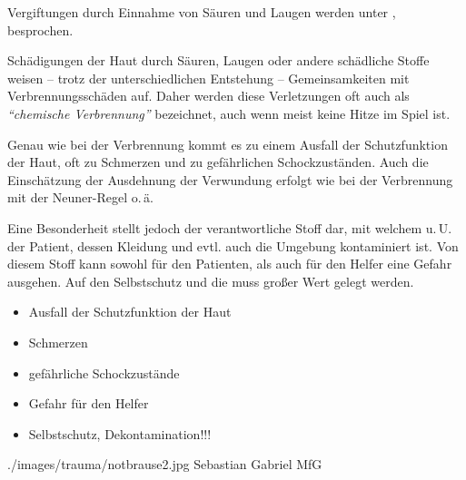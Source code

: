 Vergiftungen durch Einnahme von Säuren und Laugen werden 
unter , besprochen. 


\TextSlideTeaser
{\TxBeschreibung}%
{%
Schädigungen der Haut durch Säuren, Laugen oder andere
schädliche Stoffe weisen -- trotz der unterschiedlichen
Entstehung -- Gemeinsamkeiten mit Verbrennungsschäden auf.
Daher werden diese Verletzungen oft auch als
\emph{\enquote{chemische Verbrennung}} bezeichnet, auch wenn meist
keine Hitze im Spiel ist.

Genau wie bei der Verbrennung kommt es zu einem Ausfall der
Schutzfunktion der Haut, oft zu Schmerzen und zu
gefährlichen Schockzuständen. Auch die Einschätzung der
Ausdehnung der Verwundung erfolgt wie bei der Verbrennung
mit der Neuner-Regel o.\,ä.

Eine Besonderheit stellt jedoch der verantwortliche Stoff
dar, mit welchem u.\,U. der Patient, dessen Kleidung und
evtl. auch die Umgebung kontaminiert ist. Von diesem Stoff
kann sowohl für den Patienten, als auch für den Helfer eine
Gefahr ausgehen. Auf den Selbstschutz und die
 muss großer Wert gelegt werden.}%
{
\begin{itemize}
  \item Ausfall der Schutzfunktion der Haut
  \item Schmerzen
  \item gefährliche Schockzustände
  \item Gefahr für den Helfer
  \item Selbstschutz, Dekontamination!!!
\end{itemize}}%
{./images/trauma/notbrause2.jpg}%
{}%
{}%
{Sebastian Gabriel}%
{MfG}%

\begin{Literary}
\end{Literary}










\clearpage %
